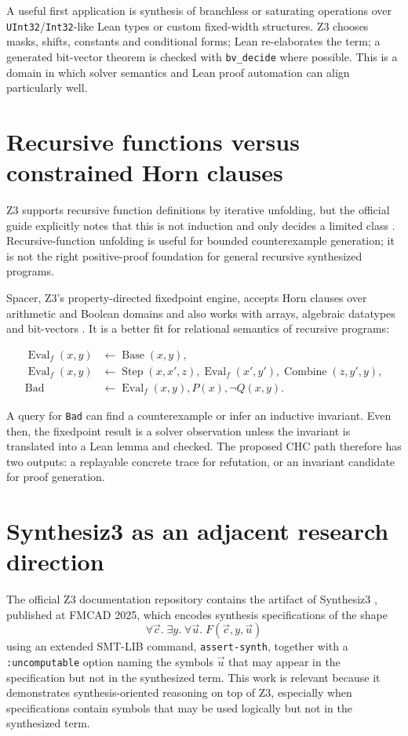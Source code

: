 \documentclass[11pt,oneside]{report}
\newcommand{\code}[1]{\texttt{#1}}
\begin{document}
A useful first application is synthesis of branchless or saturating operations over \code{UInt32}/\code{Int32}-like Lean types or custom fixed-width structures. Z3 chooses masks, shifts, constants and conditional forms; Lean re-elaborates the term; a generated bit-vector theorem is checked with \code{bv\_decide} where possible. This is a domain in which solver semantics and Lean proof automation can align particularly well.

\section{Recursive functions versus constrained Horn clauses}

Z3 supports recursive function definitions by iterative unfolding, but the official guide explicitly notes that this is not induction and only decides a limited class \cite{z3-recursive}. Recursive-function unfolding is useful for bounded counterexample generation; it is not the right positive-proof foundation for general recursive synthesized programs.

Spacer, Z3's property-directed fixedpoint engine, accepts Horn clauses over arithmetic and Boolean domains and also works with arrays, algebraic datatypes and bit-vectors \cite{z3-spacer}. It is a better fit for relational semantics of recursive programs:

\begin{align*}
\operatorname{Eval}_f(x,y) &\leftarrow \operatorname{Base}(x,y),\\
\operatorname{Eval}_f(x,y) &\leftarrow \operatorname{Step}(x,x',z),
    \operatorname{Eval}_f(x',y'),\operatorname{Combine}(z,y',y),\\
\operatorname{Bad} &\leftarrow \operatorname{Eval}_f(x,y),P(x),\neg Q(x,y).
\end{align*}

A query for \code{Bad} can find a counterexample or infer an inductive invariant. Even then, the fixedpoint result is a solver observation unless the invariant is translated into a Lean lemma and checked. The proposed CHC path therefore has two outputs: a replayable concrete trace for refutation, or an invariant candidate for proof generation.

\section{Synthesiz3 as an adjacent research direction}

The official Z3 documentation repository contains the artifact of Synthesiz3 \cite{synthesiz3}, published at FMCAD 2025, which encodes synthesis specifications of the shape
\[
  \forall \vec{c}.\;\exists y.\;\forall \vec{u}.\;F(\vec{c},y,\vec{u})
\]
using an extended SMT-LIB command, \code{assert-synth}, together with a \code{:uncomputable} option naming the symbols $\vec{u}$ that may appear in the specification but not in the synthesized term. This work is relevant because it demonstrates synthesis-oriented reasoning on top of Z3, especially when specifications contain symbols that may be used logically but not in the synthesized term.
\end{document}
